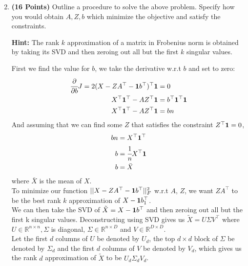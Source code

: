 \documentclass[a4paper]{article}
\newcommand*{\one}{{\bf 1}}
\theoremstyle{definition}
\newenvironment{soln}{
    \leavevmode\color{blue}\ignorespaces
}{}
\begin{document}
\begin{enumerate}
\setcounter{enumi}{1}
\item \textbf{(16 Points)}
Outline a procedure to solve the above problem. Specify how you
would obtain $A, Z, b$ which minimize the objective and satisfy the constraints.

\textbf{Hint: }The rank $k$ approximation of a matrix in Frobenius norm is obtained by
taking its SVD and then zeroing out all but the first $k$ singular values.

\begin{soln}
    First we find the value for $b$, we take the derivative w.r.t $b$ and set to zero:
    \begin{equation*}
    \begin{split}
    \cfrac{\partial}{\partial b}J = 2(X-ZA^\top-\one b^\top)^\top \one &= 0\\
    X^\top \one^\top - AZ^\top \one &= b^\top \one^\top \one \\
    X^\top \one^\top - AZ^\top \one &= bn \\
    \end{split}
    \end{equation*}
    And assuming that we can find some $Z$ that satisfies the constraint $Z^\top \one = 0$,
    \begin{equation*}
    \begin{split}
    bn &= X^\top \one^\top \\
    b &= \cfrac{1}{n} X^\top \one \\
    b &= \bar{X}
    \end{split}
    \end{equation*}
    where $\bar{X}$ is the mean of $X$. \\
    To minimize our function $||X-ZA^\top-\one b^\top||_F^2$ w.r.t $A$, $Z$, we want $ZA^\top$ to be the best rank $k$ approximation of $X - \one b_1^\top$. \\
    We can then take the SVD of $\tilde{X} = X - \one b^\top$ and then zeroing out all but the first k singular values. Deconstructing using SVD gives us $\tilde{X} = U\Sigma V^\top$ where $U \in \mathbb{R}^{n\times n}, \Sigma$ is diagonal, $\Sigma \in \mathbb{R}^{n\times D}$ and $V \in \mathbb{R}^{D\times D}$. \\
    Let the first $d$ columns of $U$ be denoted by $U_d$, the top $d\times d$ block of $\Sigma$ be denoted by $\Sigma_d$ and the first $d$ columns of $V$ be denoted by $V_d$, which gives us the rank $d$ approximation of $\tilde{X}$ to be $U_d \Sigma_d V_d$. \\

\end{soln}
\end{enumerate}
\end{document}
